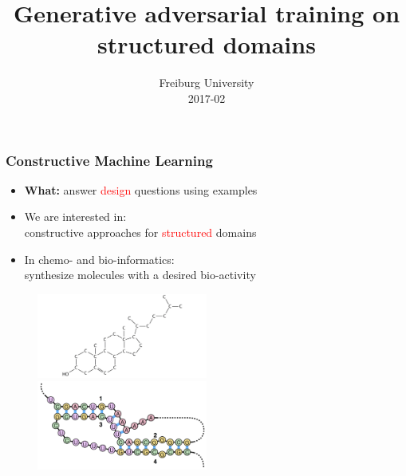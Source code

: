 \documentclass{beamer}
\title 
{Generative adversarial training on \\ structured domains}
\author %
{\underline{Stefan Mautner} \and Fabrizio Costa 
    \small{ 
        \texttt{
            \href{mailto:mautner@informatik.uni-freiburg.de}
            {mautner@informatik.uni-freiburg.de}
        }
        \texttt{
            \href{mailto:f.costa@exeter.ac.uk}
            {f.costa@exeter.ac.uk}
        }
   }
}
\date 
{Freiburg University \\2017-02}
\newcommand{\red}[1]{\textcolor{red}{#1}}
\begin{document}
\frame{\titlepage}



\begin{frame}
\frametitle{Constructive Machine Learning}

    \begin{itemize}
        \item {\bf What:} answer \red{design} questions using examples
        \item We are interested in: \\
        constructive approaches for \red{structured} domains
        \item In chemo- and bio-informatics: \\
        synthesize molecules with a desired bio-activity
    \end{itemize}
    \begin{figure}
        \centering
        \includegraphics[width=0.5\textwidth]{images/mol.jpg}
        \includegraphics[width=0.5\textwidth]{images/rna.png}
    \end{figure}    
\end{frame}
\end{document}
